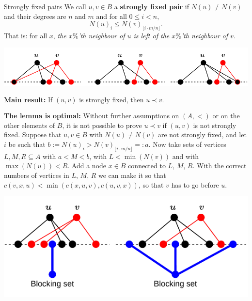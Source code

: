 \documentclass[final]{beamer}
\newlength{\colwidth}
\theoremstyle{remark}
\renewcommand{\b}{\prec}
\begin{document}
\begin{frame}[t]
\begin{columns}[t]
\begin{column}{\colwidth}
      \begin{block}{Strongly fixed pairs}
        We call $u, v \in B$ a \textbf{strongly fixed pair} if $N(u) \neq N(v)$
        and their degrees are $n$
        and $m$ and for all $0 \leq i < n$,
        $$N(u)_i \leq N(v)_{\lfloor i\cdot m/n \rfloor}.$$
        That is: for all $x$, \emph{the $x\%$'th neighbour of $u$ is left of the $x\%$'th
        neighbour of $v$}.

        \begin{center}
          \vspace{-2em}
        \includegraphics[scale=1.5]{fig/strongly-fixed.pdf}
          \vspace{-2em}
        \end{center}

        \textbf{Main result:}
        If $(u, v)$ is strongly fixed, then $u \b v$.

        \textbf{The lemma is optimal:}
        Without further assumptions on $(A, <)$ or on the other elements of $B$, it is not
          possible to prove $u \b v$ if $(u, v)$ is not strongly fixed.
        Suppose that $u, v \in B$ with $N(u) \neq N(v)$ are not strongly fixed, and let $i$ be
        such that $b:=N(u)_i > N(v)_{\lfloor i\cdot m/n\rfloor}=:a$. Now take sets of vertices $L, M,
          R \subseteq A$ with $a < M < b$, with $L < \min(N(v))$ and with
          $\max(N(u)) < R$.
          Add a node $x \in B$ connected to $L$, $M$, $R$. With the correct numbers of vertices in
          $L$, $M$, $R$ we can make it so that $c(v, x, u) < \min(c(x, u, v), c(u, v, x))$, so that
        $v$ has to go before $u$.

        \centering
          \vspace{-0.5em}
        \includegraphics[scale=1.5]{fig/blocking-set.pdf}
          \vspace{-1em}
      \end{block}


\end{column}
\end{columns}
\end{frame}
\end{document}
